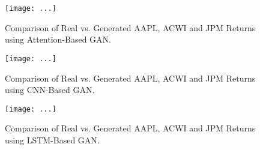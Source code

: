 \documentclass{article}
\begin{document}
\begin{figure}[h!]
    \centering
    \texttt{[image: ...]}
    \caption{Comparison of Real vs. Generated AAPL, ACWI and JPM Returns using Attention-Based GAN.}
    \label{fig:attention_comparison}
\end{figure}

\begin{figure}[h!]
    \centering
    \texttt{[image: ...]}
    \caption{Comparison of Real vs. Generated AAPL, ACWI and JPM Returns using CNN-Based GAN.}
    \label{fig:cnn_comparison}
\end{figure}

\begin{figure}[h!]
    \centering
    \texttt{[image: ...]}
    \caption{Comparison of Real vs. Generated AAPL, ACWI and JPM Returns using LSTM-Based GAN.}
    \label{fig:lstm_comparison}
\end{figure}
\end{document}
